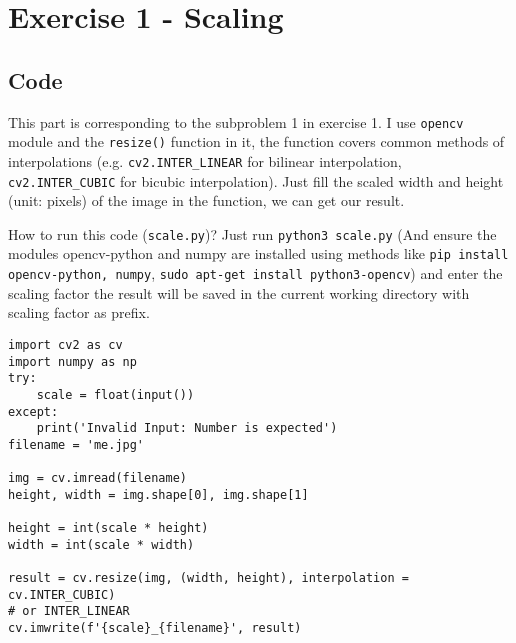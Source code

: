\documentclass[12pt]{article}
\title{\mytitle}
\author{\textbf{\myauthor}}
\date{Due: 10/13/2025}
\begin{document}
\onehalfspacing
\maketitle

\section{Exercise 1 - Scaling}
\subsection{Code}
This part is corresponding to the subproblem 1 in exercise 1. I use \texttt{opencv} module and the \texttt{resize()} function in it, the function covers common methods of interpolations (e.g. \texttt{cv2.INTER\_LINEAR} for bilinear interpolation, \texttt{cv2.INTER\_CUBIC} for bicubic interpolation). Just fill the scaled width and height (unit: pixels) of the image in the function, we can get our result.

How to run this code (\texttt{scale.py})? Just run \texttt{python3 scale.py} (And ensure the modules opencv-python and numpy are installed using methods like \texttt{pip install opencv-python, numpy}, \texttt{sudo apt-get install python3-opencv}) and enter the scaling factor the result will be saved in the current working directory with scaling factor as prefix.

\begin{verbatim}
import cv2 as cv
import numpy as np
try:
    scale = float(input())
except:
    print('Invalid Input: Number is expected')
filename = 'me.jpg'

img = cv.imread(filename)
height, width = img.shape[0], img.shape[1]

height = int(scale * height)
width = int(scale * width)

result = cv.resize(img, (width, height), interpolation = cv.INTER_CUBIC)
# or INTER_LINEAR
cv.imwrite(f'{scale}_{filename}', result)
\end{verbatim}
\end{document}
